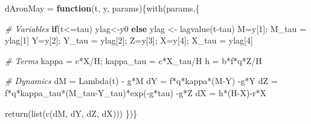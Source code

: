 \documentclass[
]{book}
\newenvironment{Shaded}{\begin{snugshade}}{\end{snugshade}}
\newcommand{\CommentTok}[1]{\textcolor[rgb]{0.56,0.35,0.01}{\textit{#1}}}
\newcommand{\ControlFlowTok}[1]{\textcolor[rgb]{0.13,0.29,0.53}{\textbf{#1}}}
\newcommand{\DecValTok}[1]{\textcolor[rgb]{0.00,0.00,0.81}{#1}}
\newcommand{\FunctionTok}[1]{\textcolor[rgb]{0.00,0.00,0.00}{#1}}
\newcommand{\NormalTok}[1]{#1}
\newcommand{\OtherTok}[1]{\textcolor[rgb]{0.56,0.35,0.01}{#1}}
\newcommand{\SpecialCharTok}[1]{\textcolor[rgb]{0.00,0.00,0.00}{#1}}
\begin{document}
\begin{Shaded}
\begin{Highlighting}[]
\NormalTok{dAronMay }\OtherTok{=} \ControlFlowTok{function}\NormalTok{(t, y, params)\{}\FunctionTok{with}\NormalTok{(params,\{}
 
  \CommentTok{\# Variables  }
  \ControlFlowTok{if}\NormalTok{(t}\SpecialCharTok{\textless{}=}\NormalTok{tau) ylag}\OtherTok{\textless{}{-}}\NormalTok{y0 }\ControlFlowTok{else}\NormalTok{ ylag }\OtherTok{\textless{}{-}} \FunctionTok{lagvalue}\NormalTok{(t}\SpecialCharTok{{-}}\NormalTok{tau)}
\NormalTok{  M}\OtherTok{=}\NormalTok{y[}\DecValTok{1}\NormalTok{]; M\_tau }\OtherTok{=}\NormalTok{ ylag[}\DecValTok{1}\NormalTok{]}
\NormalTok{  Y}\OtherTok{=}\NormalTok{y[}\DecValTok{2}\NormalTok{]; Y\_tau }\OtherTok{=}\NormalTok{ ylag[}\DecValTok{2}\NormalTok{]; }
\NormalTok{  Z}\OtherTok{=}\NormalTok{y[}\DecValTok{3}\NormalTok{]; }
\NormalTok{  X}\OtherTok{=}\NormalTok{y[}\DecValTok{4}\NormalTok{]; X\_tau }\OtherTok{=}\NormalTok{ ylag[}\DecValTok{4}\NormalTok{]}
   
  \CommentTok{\# Terms }
\NormalTok{  kappa }\OtherTok{=}\NormalTok{ c}\SpecialCharTok{*}\NormalTok{X}\SpecialCharTok{/}\NormalTok{H; kappa\_tau }\OtherTok{=}\NormalTok{ c}\SpecialCharTok{*}\NormalTok{X\_tau}\SpecialCharTok{/}\NormalTok{H}
\NormalTok{  h }\OtherTok{=}\NormalTok{ b}\SpecialCharTok{*}\NormalTok{f}\SpecialCharTok{*}\NormalTok{q}\SpecialCharTok{*}\NormalTok{Z}\SpecialCharTok{/}\NormalTok{H }
   
  \CommentTok{\# Dynamics }
\NormalTok{  dM }\OtherTok{=} \FunctionTok{Lambda}\NormalTok{(t) }\SpecialCharTok{{-}}\NormalTok{ g}\SpecialCharTok{*}\NormalTok{M}
\NormalTok{  dY }\OtherTok{=}\NormalTok{ f}\SpecialCharTok{*}\NormalTok{q}\SpecialCharTok{*}\NormalTok{kappa}\SpecialCharTok{*}\NormalTok{(M}\SpecialCharTok{{-}}\NormalTok{Y) }\SpecialCharTok{{-}}\NormalTok{g}\SpecialCharTok{*}\NormalTok{Y}
\NormalTok{  dZ }\OtherTok{=}\NormalTok{ f}\SpecialCharTok{*}\NormalTok{q}\SpecialCharTok{*}\NormalTok{kappa\_tau}\SpecialCharTok{*}\NormalTok{(M\_tau}\SpecialCharTok{{-}}\NormalTok{Y\_tau)}\SpecialCharTok{*}\FunctionTok{exp}\NormalTok{(}\SpecialCharTok{{-}}\NormalTok{g}\SpecialCharTok{*}\NormalTok{tau) }\SpecialCharTok{{-}}\NormalTok{g}\SpecialCharTok{*}\NormalTok{Z}
\NormalTok{  dX }\OtherTok{=}\NormalTok{ h}\SpecialCharTok{*}\NormalTok{(H}\SpecialCharTok{{-}}\NormalTok{X)}\SpecialCharTok{{-}}\NormalTok{r}\SpecialCharTok{*}\NormalTok{X}
  
  \FunctionTok{return}\NormalTok{(}\FunctionTok{list}\NormalTok{(}\FunctionTok{c}\NormalTok{(dM, dY, dZ, dX)))}
\NormalTok{\})\} }
\end{Highlighting}
\end{Shaded}
\end{document}
